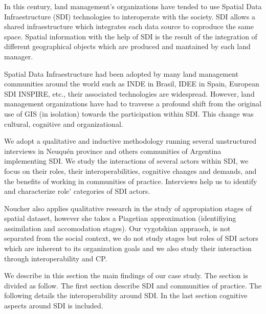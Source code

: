 \documentclass[10pt,twocolumn,ieeetran]{article}
\begin{document}





In this century, land management's organizations have tended to use Spatial Data Infraestructure (SDI) technologies to interoperate with the society. SDI allows a shared infraestructure which integrates each data source to coproduce the same space. Spatial information with the help of SDI is the result of the integration of different geographical objects which are produced and mantained by each land manager.

Spatial Data Infraestructure had been adopted by many land management communities around the world such as   INDE in Brasil, IDEE in Spain, European SDI INSPIRE, etc., their associated technologies are widespread. However, land management organizations have had to traverse a profound shift from the original use of GIS (in isolation) towards the participation within SDI.
This change was cultural, cognitive and organizational.

We adopt a qualitative and inductive methodology running several unstructured interviews in Neuqu\' en province and others communities of Argentina implementing SDI. We study the interactions of several actors within SDI, we focus on their roles, their interoperabilities, cognitive changes and demands, and the benefits of working in communities of practice.  Interviews help us to identify and characterize role'
categories of SDI actors.


Noucher \cite{Noucher1} also applies qualitative research in the study of appropiation stages of spatial dataset, however she takes a Piagetian approximation (identifiying assimilation and accomodation stages). 
Our vygotskian appraoch, is not separated from the social context, we do not study stages but roles of SDI actors which are inherent to its organization goals and we also study their interaction through interoperability and CP.


We describe in this section the main findings of our case study. The section is divided as follow. The first section describe SDI and communities of practice. The following details the interoperability around SDI. In the last section cognitive aspects around SDI is included.
 
\end{document}
